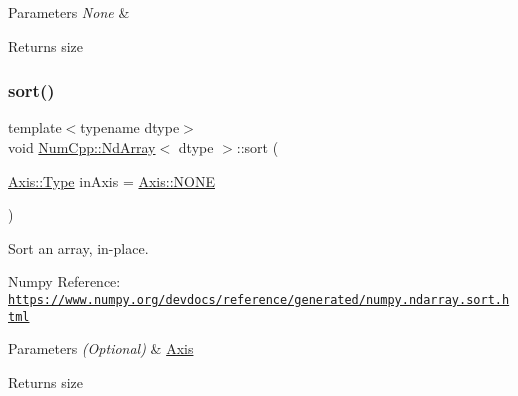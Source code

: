 \begin{DoxyParams}{Parameters}
{\em None} & \\
\hline
\end{DoxyParams}
\begin{DoxyReturn}{Returns}
size 
\end{DoxyReturn}
\mbox{\label{class_num_cpp_1_1_nd_array_aaebf5b951b3f751b893b3d9ecd58b047}} 
\subsubsection{\texorpdfstring{sort()}{sort()}}
{\footnotesize\ttfamily template$<$typename dtype$>$ \\
void \mbox{\hyperlink{class_num_cpp_1_1_nd_array}{Num\+Cpp\+::\+Nd\+Array}}$<$ dtype $>$\+::sort (\begin{DoxyParamCaption}\item[{\mbox{\hyperlink{struct_num_cpp_1_1_axis_ac10eb76f8631762d9ed70c40c42ca6cb}{Axis\+::\+Type}}}]{in\+Axis = {\ttfamily \mbox{\hyperlink{struct_num_cpp_1_1_axis_ac10eb76f8631762d9ed70c40c42ca6cba747ae657022cca1d87702b56d0c038e9}{Axis\+::\+N\+O\+NE}}} }\end{DoxyParamCaption})\hspace{0.3cm}{\ttfamily [inline]}}

Sort an array, in-\/place.

Numpy Reference\+: \href{https://www.numpy.org/devdocs/reference/generated/numpy.ndarray.sort.html}{\tt https\+://www.\+numpy.\+org/devdocs/reference/generated/numpy.\+ndarray.\+sort.\+html}


\begin{DoxyParams}{Parameters}
{\em (\+Optional)} & \mbox{\hyperlink{struct_num_cpp_1_1_axis}{Axis}} \\
\hline
\end{DoxyParams}
\begin{DoxyReturn}{Returns}
size 
\end{DoxyReturn}
\mbox{\label{class_num_cpp_1_1_nd_array_a8e5826329c1e0701553e1963a2af40e0}} 
